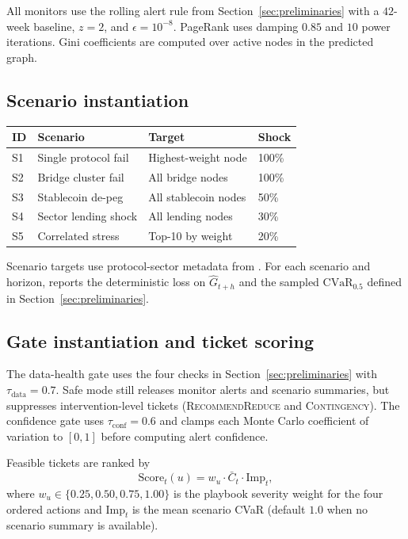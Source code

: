 All monitors use the rolling alert rule from
Section~\ref{sec:preliminaries} with a $42$-week baseline, $z=2$, and
$\epsilon=10^{-8}$. PageRank uses damping $0.85$ and $10$ power iterations.
Gini coefficients are computed over active nodes in the predicted graph.

\subsection{Scenario instantiation}

\begin{center}\small
\begin{tabular}{@{}llll@{}}
\toprule
ID & Scenario               & Target                 & Shock \\
\midrule
S1 & Single protocol fail   & Highest-weight node    & 100\% \\
S2 & Bridge cluster fail    & All bridge nodes       & 100\% \\
S3 & Stablecoin de-peg      & All stablecoin nodes   & 50\%  \\
S4 & Sector lending shock   & All lending nodes      & 30\%  \\
S5 & Correlated stress      & Top-10 by weight       & 20\%  \\
\bottomrule
\end{tabular}
\end{center}

Scenario targets use protocol-sector metadata from \corpusname{}. For each
scenario and horizon, \sysname{} reports the deterministic loss on
$\widehat{G}_{t+h}$ and the sampled $\mathrm{CVaR}_{0.5}$ defined in
Section~\ref{sec:preliminaries}.

\subsection{Gate instantiation and ticket scoring}

The data-health gate uses the four checks in Section~\ref{sec:preliminaries}
with $\tau_{\mathrm{data}}=0.7$. Safe mode still releases monitor alerts and
scenario summaries, but suppresses intervention-level tickets
(\textsc{RecommendReduce} and \textsc{Contingency}). The confidence gate uses
$\tau_{\mathrm{conf}}=0.6$ and clamps each Monte Carlo coefficient of
variation to $[0,1]$ before computing alert confidence.

Feasible tickets are ranked by
\begin{equation}
\mathrm{Score}_t(u)
=
w_u\cdot \bar{C}_t\cdot \mathrm{Imp}_t,
\end{equation}
where $w_u\in\{0.25,0.50,0.75,1.00\}$ is the playbook severity weight for
the four ordered actions and $\mathrm{Imp}_t$ is the mean scenario CVaR
(default $1.0$ when no scenario summary is available).

